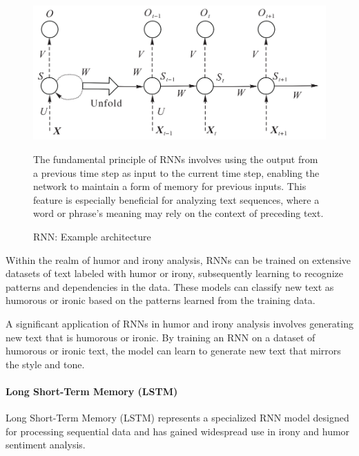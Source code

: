 \documentclass[a4paper]{article}
\begin{document}
\begin{figure}[H]
    \centering
    \begin{minipage}{0.48\textwidth}
        \centering
        \includegraphics[width=1\textwidth]{./images/RNN_architecture.png}
        \caption{RNN: Example architecture}
        \label{fig.RNN[Review of applications of natural language processing in text sentiment analysis]}
    \end{minipage}\hfill
    \begin{minipage}{0.48\textwidth}
        The fundamental principle of RNNs involves using the output from a previous time step as input to the current time step, enabling the network to maintain a form of memory for previous inputs. This feature is especially beneficial for analyzing text sequences, where a word or phrase's meaning may rely on the context of preceding text.
    \end{minipage}
\end{figure}

Within the realm of humor and irony analysis, RNNs can be trained on extensive datasets of text labeled with humor or irony, subsequently learning to recognize patterns and dependencies in the data. These models can classify new text as humorous or ironic based on the patterns learned from the training data.

A significant application of RNNs in humor and irony analysis involves generating new text that is humorous or ironic. By training an RNN on a dataset of humorous or ironic text, the model can learn to generate new text that mirrors the style and tone.

\paragraph{Long Short-Term Memory (LSTM)}

Long Short-Term Memory (LSTM) represents a specialized RNN model designed for processing sequential data and has gained widespread use in irony and humor sentiment analysis.
\end{document}
